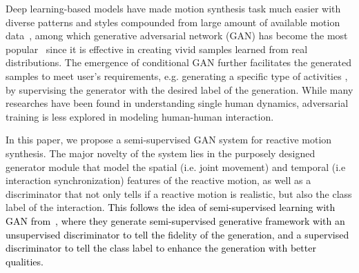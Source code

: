 \documentclass[times,twocolumn,final]{elsarticle}
\begin{document}
Deep learning-based models have made motion synthesis task much easier with diverse patterns and styles compounded from large amount of available motion data~\cite{habibie2017recurrent,yu2020structure,battan2021glocalnet}, among which generative adversarial network (GAN) \cite{goodfellow2014generative} has become the most popular~\cite{gui2018adversarial,dong2020adult2child,ferstl2020adversarial} since it is effective in creating vivid samples learned from real distributions. The emergence of conditional GAN \cite{mirza2014conditional} further facilitates the generated samples to meet user's requirements, e.g. generating a specific type of activities \cite{xu2019prediction}, by supervising the generator with the desired label of the generation. While many researches have been found in understanding single human dynamics, adversarial training is less explored in modeling human-human interaction.

In this paper, we propose a semi-supervised GAN system for reactive motion synthesis. The major novelty of the system lies in the purposely designed generator module that model the spatial (i.e. joint movement) and temporal (i.e interaction synchronization) features of the reactive motion, as well as a discriminator that not only tells if a reactive motion is realistic, but also the class label of the interaction. \textcolor{black}{This follows the idea of semi-supervised learning with GAN from~\cite{odena2016semi,kumar2017semi}, where they generate semi-supervised generative framework with an unsupervised discriminator to tell the fidelity of the generation, and a supervised discriminator to tell the class label to enhance the generation with better qualities.}



\end{document}
